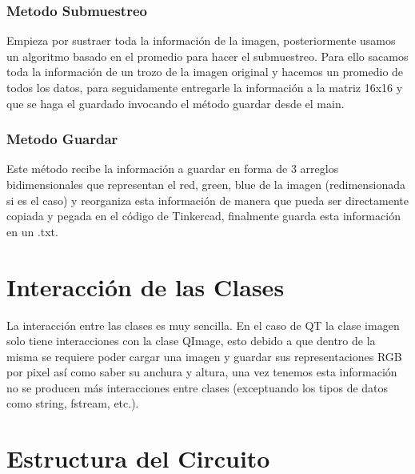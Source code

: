 \documentclass{article}
\begin{document}
    \begin{flushleft}
    \subsubsection{Metodo Submuestreo}
    Empieza por sustraer toda la información de la imagen, posteriormente usamos un algoritmo basado en el promedio para hacer el submuestreo. Para ello sacamos toda la información de un trozo de la imagen original y hacemos un promedio de todos los datos, para seguidamente entregarle la información a la matriz 16x16 y que se haga el guardado invocando el método guardar desde el main.
    \end{flushleft}
    
    \begin{flushleft}
    \subsubsection{Metodo Guardar}
    Este método recibe la información a guardar en forma de 3 arreglos bidimensionales que representan el red, green, blue de la imagen (redimensionada si es el caso) y reorganiza esta información de manera que pueda ser directamente copiada y pegada en el código de Tinkercad, finalmente guarda esta información en un .txt.
    \end{flushleft}
        
    
\section{Interacción de las Clases}
\label{interacciones}
    \begin{flushleft}
    La interacción entre las clases es muy sencilla. En el caso de QT la clase imagen solo tiene interacciones con la clase QImage, esto debido a que dentro de la misma se requiere poder cargar una imagen y guardar sus representaciones RGB por pixel así como saber su anchura y altura, una vez tenemos esta información no se producen más interacciones entre clases (exceptuando los tipos de datos como string, fstream, etc.).
    \end{flushleft}
  
  \newpage  
    
\section{Estructura del Circuito}
\label{circuito}
    \vspace{0.1cm}
\end{document}
